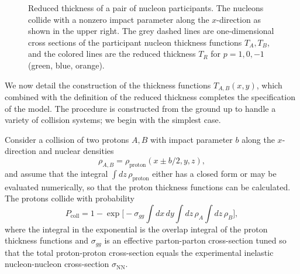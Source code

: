 \documentclass[aps,prc,reprint,amsmath]{revtex4-1}
\begin{document}
\begin{figure}[t]
  \caption{
    \label{fig:TR}
    Reduced thickness of a pair of nucleon participants.
    The nucleons collide with a nonzero impact parameter along the $x$-direction as shown in the upper right.
    The grey dashed lines are one-dimensional cross sections of the participant nucleon thickness functions $T_A, T_B$, and the colored lines are the reduced thickness $T_R$ for $p = 1, 0, -1$ (green, blue, orange).
  }
\end{figure}

We now detail the construction of the thickness functions $T_{A,B}(x, y)$, which combined with the definition
of the reduced thickness completes the specification of the model.  The procedure is constructed from the
ground up to handle a variety of collision systems; we begin with the simplest case.

Consider a collision of two protons $A, B$ with impact parameter $b$ along the $x$-direction and nuclear densities
\begin{equation}
  \rho_{A,B} = \rho_\text{proton}(x \pm b/2, y, z),
\end{equation}
and assume that the integral $\int dz \, \rho_\text{proton}$ either has a closed form or may be evaluated numerically, so that the proton thickness functions can be calculated.
The protons collide with probability \cite{dEnterria:2010hd}
\begin{equation}
  P_\text{coll} = 1 - \exp\biggl[ -\sigma_{gg} \int dx \, dy \int dz \, \rho_A \int dz \, \rho_B \biggr],
  \label{eq:pcoll}
\end{equation}
where the integral in the exponential is the overlap integral of the proton thickness functions and
$\sigma_{gg}$ is an effective parton-parton cross-section tuned so that the total proton-proton
cross-section equals the experimental inelastic nucleon-nucleon cross-section $\sigma_\text{NN}$.
\end{document}

